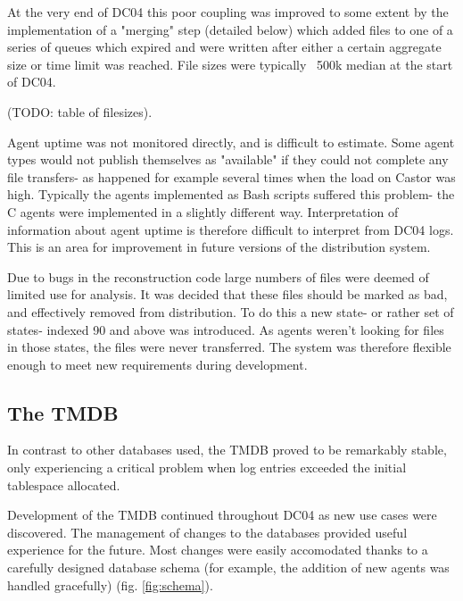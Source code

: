 \documentclass{cmspaper}
\begin{document}
At the very end of DC04 this poor coupling was improved to some extent by the implementation of a "merging" step (detailed below) which added files to one of a series of queues which expired and were written after either a certain aggregate size or time limit was reached. File sizes were typically ~500k median at the start of DC04.

(TODO: table of filesizes).

Agent uptime was not monitored directly, and is difficult to estimate. Some agent types would not publish themselves as "available" if they could not complete any file transfers- as happened for example several times when the load on Castor was high. Typically the agents implemented as Bash scripts suffered this problem- the C agents were implemented in a slightly different way.  Interpretation of information about agent uptime is therefore difficult to interpret from DC04 logs. This is an area for improvement in future versions of the distribution system.

Due to bugs in the reconstruction code large numbers of files were deemed of limited use for analysis. It was decided that these files should be marked as bad, and effectively removed from distribution. To do this a new state- or rather set of states- indexed 90 and above was introduced. As agents weren't looking for files in those states, the files were never transferred. The system was therefore flexible enough to meet new requirements during development.

\subsection{The TMDB}
In contrast to other databases used, the TMDB proved to be remarkably stable, only experiencing a critical problem when log entries exceeded the initial tablespace allocated.

Development of the TMDB continued throughout DC04 as new use cases were discovered. The management of changes to the databases provided useful experience for the future. Most changes were easily accomodated thanks to a carefully designed database schema (for example, the addition of new agents was handled gracefully) (fig. \ref{fig:schema}).
\end{document}

